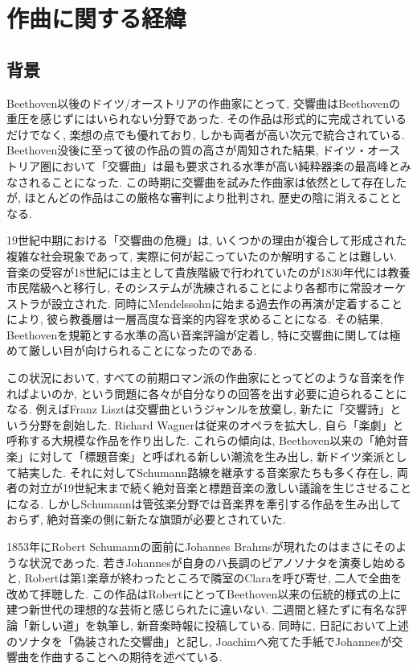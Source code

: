 
\chapter{作曲に関する経緯}

\section{背景}\label{sec: background}

Beethoven以後のドイツ/オーストリアの作曲家にとって, 交響曲はBeethovenの重圧を感じずにはいられない分野であった.
その作品は形式的に完成されているだけでなく, 楽想の点でも優れており, しかも両者が高い次元で統合されている.
Beethoven没後に至って彼の作品の質の高さが周知された結果, ドイツ・オーストリア圏において「交響曲」は最も要求される水準が高い純粋器楽の最高峰とみなされることになった.
この時期に交響曲を試みた作曲家は依然として存在したが, ほとんどの作品はこの厳格な審判により批判され, 歴史の陰に消えることとなる.

19世紀中期における「交響曲の危機」は, いくつかの理由が複合して形成された複雑な社会現象であって, 実際に何が起こっていたのか解明することは難しい\cite{frisch}.
音楽の受容が18世紀には主として貴族階級で行われていたのが1830年代には教養市民階級へと移行し, そのシステムが洗練されることにより各都市に常設オーケストラが設立された.
同時にMendelssohnに始まる過去作の再演が定着することにより, 彼ら教養層は一層高度な音楽的内容を求めることになる.
その結果, Beethovenを規範とする水準の高い音楽評論が定着し, 特に交響曲に関しては極めて厳しい目が向けられることになったのである.

この状況において, すべての前期ロマン派の作曲家にとってどのような音楽を作ればよいのか, という問題に各々が自分なりの回答を出す必要に迫られることになる.
例えばFranz Lisztは交響曲というジャンルを放棄し, 新たに「交響詩」という分野を創始した.
Richard Wagnerは従来のオペラを拡大し, 自ら「楽劇」と呼称する大規模な作品を作り出した.
これらの傾向は, Beethoven以来の「絶対音楽」に対して「標題音楽」と呼ばれる新しい潮流を生み出し, 新ドイツ楽派として結実した.
それに対してSchumann路線を継承する音楽家たちも多く存在し, 両者の対立が19世紀末まで続く絶対音楽と標題音楽の激しい議論を生じさせることになる.
しかしSchumannは管弦楽分野では音楽界を牽引する作品を生み出しておらず, 絶対音楽の側に新たな旗頭が必要とされていた.

1853年にRobert Schumannの面前にJohannes Brahmsが現れたのはまさにそのような状況であった.
若きJohannesが自身のハ長調のピアノソナタを演奏し始めると, Robertは第1楽章が終わったところで隣室のClaraを呼び寄せ, 二人で全曲を改めて拝聴した.
この作品はRobertにとってBeethoven以来の伝統的様式の上に建つ新世代の理想的な芸術と感じられたに違いない.
二週間と経たずに有名な評論「新しい道」を執筆し, 新音楽時報に投稿している.
同時に, 日記において上述のソナタを「偽装された交響曲」と記し, Joachimへ宛てた手紙でJohannesが交響曲を作曲することへの期待を述べている.

